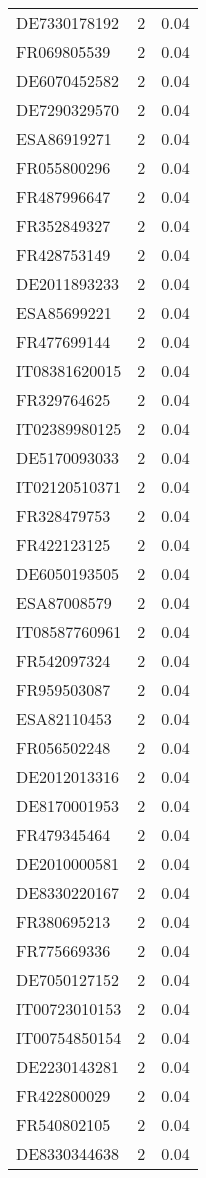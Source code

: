 \begin{table*}[htbp]
\begin{tabular}{lrr}
DE7330178192 & 2 & 0.04 \\
FR069805539 & 2 & 0.04 \\
DE6070452582 & 2 & 0.04 \\
DE7290329570 & 2 & 0.04 \\
ESA86919271 & 2 & 0.04 \\
FR055800296 & 2 & 0.04 \\
FR487996647 & 2 & 0.04 \\
FR352849327 & 2 & 0.04 \\
FR428753149 & 2 & 0.04 \\
DE2011893233 & 2 & 0.04 \\
ESA85699221 & 2 & 0.04 \\
FR477699144 & 2 & 0.04 \\
IT08381620015 & 2 & 0.04 \\
FR329764625 & 2 & 0.04 \\
IT02389980125 & 2 & 0.04 \\
DE5170093033 & 2 & 0.04 \\
IT02120510371 & 2 & 0.04 \\
FR328479753 & 2 & 0.04 \\
FR422123125 & 2 & 0.04 \\
DE6050193505 & 2 & 0.04 \\
ESA87008579 & 2 & 0.04 \\
IT08587760961 & 2 & 0.04 \\
FR542097324 & 2 & 0.04 \\
FR959503087 & 2 & 0.04 \\
ESA82110453 & 2 & 0.04 \\
FR056502248 & 2 & 0.04 \\
DE2012013316 & 2 & 0.04 \\
DE8170001953 & 2 & 0.04 \\
FR479345464 & 2 & 0.04 \\
DE2010000581 & 2 & 0.04 \\
DE8330220167 & 2 & 0.04 \\
FR380695213 & 2 & 0.04 \\
FR775669336 & 2 & 0.04 \\
DE7050127152 & 2 & 0.04 \\
IT00723010153 & 2 & 0.04 \\
IT00754850154 & 2 & 0.04 \\
DE2230143281 & 2 & 0.04 \\
FR422800029 & 2 & 0.04 \\
FR540802105 & 2 & 0.04 \\
DE8330344638 & 2 & 0.04 \\

\end{tabular}
\end{table*}
